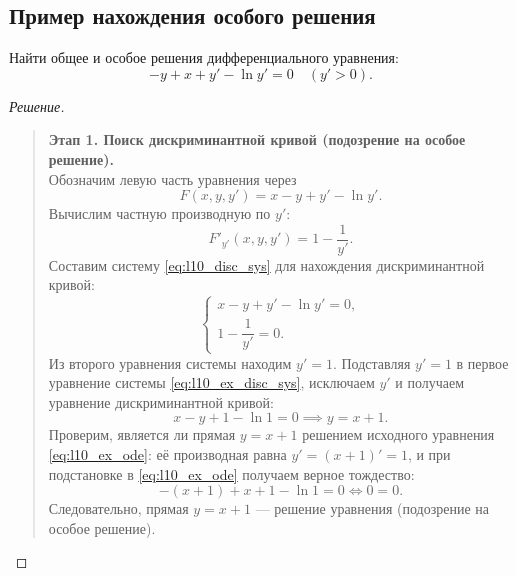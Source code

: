 \subsection{Пример нахождения особого решения}

\begin{example}
    Найти общее и особое решения дифференциального уравнения:
    \begin{equation} \label{eq:l10_ex_ode}
        -y + x + y' - \ln y' = 0 \quad (y' > 0). \tag{5}
    \end{equation}

    \begin{proof}[Решение]~\\
        \begin{quote}
            \textbf{Этап 1. Поиск дискриминантной кривой (подозрение на особое
            решение).}\\
            Обозначим левую часть уравнения через
            \[
                F(x, y, y') = x - y + y' - \ln y'.
            \]
            Вычислим частную производную по $y'$:
            \[
                F'_{y'}(x, y, y') = 1 - \frac{1}{y'}.
            \]
            Составим систему \eqref{eq:l10_disc_sys} для нахождения
            дискриминантной кривой:
            \begin{equation} \label{eq:l10_ex_disc_sys}
                \begin{cases}
                    x - y + y' - \ln y' = 0, \\[1mm]
                    1 - \dfrac{1}{y'} = 0.
                \end{cases} \tag{6}
            \end{equation}
            Из второго уравнения системы находим $y' = 1$. Подставляя $y' = 1$
            в первое уравнение системы \eqref{eq:l10_ex_disc_sys}, исключаем
            $y'$ и получаем уравнение дискриминантной кривой:
            \[
                x - y + 1 - \ln 1 = 0 \implies y = x + 1.
            \]
            Проверим, является ли прямая $y = x + 1$ решением исходного
            уравнения \eqref{eq:l10_ex_ode}: её производная равна
            $y' = (x + 1)' = 1$, и при подстановке в \eqref{eq:l10_ex_ode}
            получаем верное тождество:
            \[
                -(x + 1) + x + 1 - \ln 1 = 0 \iff 0 = 0.
            \]
            Следовательно, прямая $y = x + 1$ — решение уравнения (подозрение
            на особое решение).


\end{quote}
\end{proof}
\end{example}
